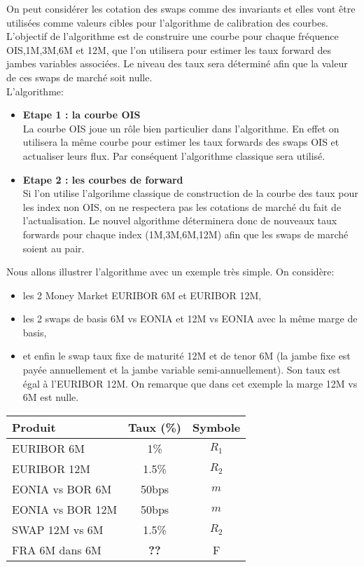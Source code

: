 \documentclass{article}
\begin{document}
On peut considérer les cotation des swaps comme des invariants et elles vont être utilisées comme valeurs cibles pour l'algorithme de calibration des courbes. L'objectif de l'algorithme est de construire une courbe pour chaque fréquence OIS,1M,3M,6M et 12M, que l'on utilisera pour estimer les taux forward des jambes variables associées. Le niveau des taux sera déterminé afin que la valeur de ces swaps de marché soit nulle.\\

L'algorithme:\\
\begin{itemize}
\item \textbf{Etape 1 : la courbe OIS}\\
La courbe OIS joue un rôle bien particulier dans l'algorithme. En effet on utilisera la même courbe pour estimer les taux forwards des swaps OIS et actualiser leurs flux. Par conséquent l'algorithme classique sera utilisé.\\
\item{\textbf{Etape 2 : les courbes de forward}}\\
Si l'on utilise l'algorihme classique de construction de la courbe des taux pour les index non OIS, on ne respectera pas les cotations de marché du fait de l'actualisation. Le nouvel algorithme déterminera donc de nouveaux taux forwards pour chaque index (1M,3M,6M,12M) afin que les swaps de marché soient au pair.\\ 
\end{itemize}

Nous allons illustrer l'algorithme avec un exemple très simple.
On considère:\\
\begin{itemize}
\item les 2 Money Market EURIBOR 6M et EURIBOR 12M,\\
\item les 2 swaps de basis 6M vs EONIA et 12M vs EONIA avec la même marge de basis,\\ 
\item et enfin le swap taux fixe de maturité 12M et de tenor 6M (la jambe fixe est payée annuellement et la jambe variable semi-annuellement). Son taux est égal à l'EURIBOR 12M. On remarque que dans cet exemple la marge 12M vs 6M est nulle.\\
\end{itemize}

\begin{center}
\begin{tabular}{|l|c|c|}
\hline
Produit & Taux (\%) & Symbole\\
\hline
EURIBOR 6M & 1\% & $R_1$ \\
EURIBOR 12M & 1.5\% & $R_2$ \\
EONIA vs BOR 6M & 50bps & $m$\\
EONIA vs BOR 12M & 50bps & $m$\\
SWAP 12M vs 6M & 1.5\% & $R_2$ \\
FRA 6M dans 6M & \textbf{??} & F \\
\hline
\end{tabular}
\end{center}
\end{document}
